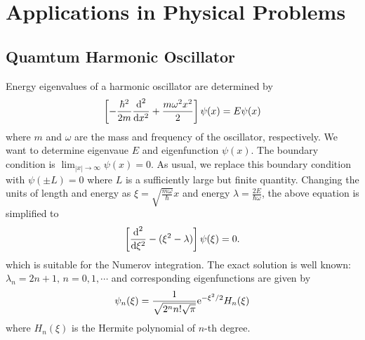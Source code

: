 	
	\bigskip


%



\noindent
\section{Applications in Physical Problems}



\subsection{Quamtum Harmonic Oscillator}\label{sec:qmho_eigenvalue}


Energy eigenvalues of a harmonic oscillator are determined by 
\begin{equation}\label{eq:qmho_eigenvalue}
\left [-\frac{\hbar^2}{2m} \frac{\text{d}^2}{\text{d} x^2} + \frac{m \omega^2 x^2}{2} \right ] \psi (x) = E \psi(x)
\end{equation}
where $m$ and $\omega$ are the mass and frequency of the oscillator, respectively.\cite{qmho} We want to determine eigenvaue $E$ and eigenfunction $\psi(x)$.  The boundary condition is $\displaystyle\lim_{|x| \rightarrow \infty} \psi(x) = 0$.  As usual, we replace this boundary condition with $\psi(\pm L) = 0$ where $L$ is a sufficiently large but finite quantity. Changing the units of length and energy as $\xi = \sqrt{\displaystyle\frac{m \omega}{\hbar}} x$ and energy $\lambda = \displaystyle\frac{2 E}{\hbar\omega}$, the above equation is simplified to\cite{qmho}
\begin{equation}\label{eq:qmho_eigen_simple}
\left [ \frac{\text{d}^2}{\text{d} \xi^2} - (\xi^2 - \lambda) \right ] \psi(\xi) = 0.
\end{equation}
which is suitable for the Numerov integration.
The exact solution is well known: $\lambda_n = 2 n + 1,\, n=0, 1, \cdots$ and corresponding eigenfunctions are given by
\begin{equation}
\psi_n(\xi) = \frac{1}{\sqrt{2^n n! \sqrt{\pi}}} \text{e}^{-\xi^2/2} H_n(\xi)
\end{equation}
where $H_n(\xi)$ is the Hermite polynomial of $n$-th degree.

